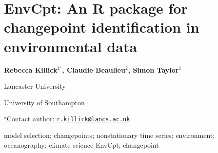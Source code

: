 \documentclass[\main/boa.tex]{subfiles}
\begin{document}
\pagestyle{empty}

\section{EnvCpt: An R package for changepoint identification in environmental
data}

\begin{center}
  {\bf Rebecca Killick$^{1^\star}$, Claudie Beaulieu$^{2}$, Simon Taylor$^{1}$}
\end{center}

\vskip 0.3cm

\begin{affiliations}
\begin{enumerate}
\begin{minipage}{0.915\textwidth}
\centering
\item Lancaster University \\[-2pt]
\item University of Southampton \\[-2pt]
\end{minipage}
\end{enumerate}
$^\star$Contact author: \href{mailto:r.killick@lancs.ac.uk}{\nolinkurl{r.killick@lancs.ac.uk}}\\
\end{affiliations}

\vskip 0.5cm

\begin{minipage}{0.915\textwidth}
\keywords model selection; changepoints; nonstationary time series; environment;
oceanography; climate science
\packages EnvCpt; changepoint
\end{minipage}

\vskip 0.8cm
\end{document}
